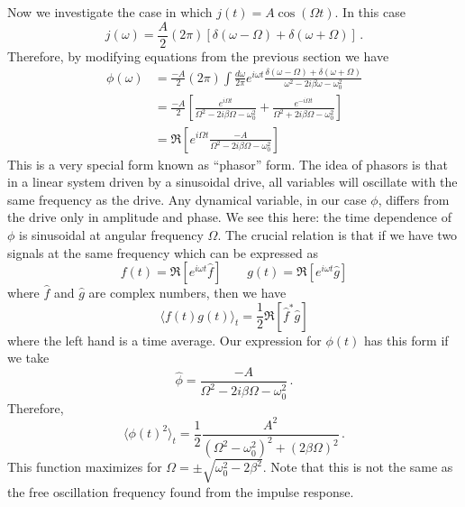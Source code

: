 \documentclass{article}
\begin{document}
Now we investigate the case in which $j(t)=A\cos(\Omega t)$.
In this case
\begin{equation}
j(\omega)=\frac{A}{2}(2\pi)\left[\delta(\omega-\Omega)+\delta(\omega+\Omega)\right] \, .
\end{equation}
Therefore, by modifying equations from the previous section we have
\begin{align}
\phi(\omega)
& = \frac{-A}{2}(2\pi) \int \frac{d\omega}{2\pi} e^{i \omega t} \frac{\delta(\omega-\Omega)+\delta(\omega+\Omega)}{\omega^{2} - 2i\beta\omega - \omega_0^2} \\
& =
\frac{-A}{2}
\left[
\frac{e^{i \Omega t}}{\Omega^{2} - 2i\beta\Omega - \omega_0^2} +
\frac{e^{-i \Omega t}}{\Omega^2 + 2i\beta\Omega - \omega_0^2}
\right] \\
&= \Re \left[ e^{i \Omega t} \frac{-A}{\Omega^2 - 2i\beta\Omega - \omega_0^2}
\right] \label{eq:phasor_form}
\end{align}
This is a very special form known as {}``phasor'' form.
The idea of phasors is that in a linear system driven by a sinusoidal drive, all variables will oscillate with the same frequency as the drive.
Any dynamical variable, in our case $\phi$, differs from the drive only in amplitude and phase.
We see this here: the time dependence of $\phi$ is sinusoidal at angular frequency $\Omega$.
The crucial relation is that if we have two signals at the same frequency which can be expressed as \begin{equation}
f(t) = \Re[ e^{i\omega t} \hat{f}] \qquad
g(t) = \Re[ e^{i\omega t} \hat{g}]
\end{equation}
where $\hat{f}$ and $\hat{g}$ are complex numbers, then we have \begin{equation}
\langle f(t)g(t)\rangle_{t}=\frac{1}{2}\Re[\hat{f}^{*}\hat{g}] \end{equation}
where the left hand is a time average.
Our expression for $\phi(t)$ has this form if we take
\begin{equation}
\hat{\phi} = \frac{-A}{\Omega^{2} - 2i\beta\Omega - \omega_0^2} \, .
\end{equation}
Therefore, \begin{equation}
\langle\phi(t)^{2}\rangle_{t} = \frac{1}{2} \frac{A^{2}}{(\Omega^{2}-\omega_0^{2})^{2}+(2\beta\Omega)^{2}} \, .
\end{equation}
This function maximizes for $\Omega=\pm\sqrt{\omega_{0}^{2}-2\beta^{2}}$.
Note that this is not the same as the free oscillation frequency found from the impulse response.
\end{document}
